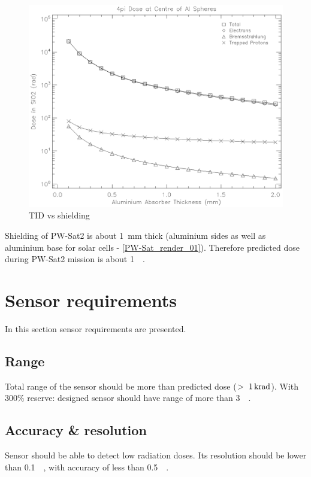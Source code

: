 	\begin{figure}[H]
		\centering
		\includegraphics[width=0.7\paperwidth]{img/dose.eps}
		\caption{TID vs shielding}
		\label{TIDvsSheilding}
	\end{figure}

	Shielding of PW-Sat2 is about \SI{1}{\milli\meter} thick (aluminium sides as well as aluminium base for solar cells - \ref{PW-Sat_render_01}). Therefore predicted dose during PW-Sat2 mission is about \SI{1}{\kilo\rad}.




\section{Sensor requirements}
	In this section sensor requirements are presented.

\subsection{Range}
	Total range of the sensor should be more than predicted dose ($>~\SI{1}{\kilo\radian}$). With $300\si{\percent}$ reserve: designed sensor should have range of more than \SI{3}{\kilo\rad}.
	
\subsection{Accuracy \& resolution}
	Sensor should be able to detect low radiation doses. Its resolution should be lower than \SI{0.1}{\kilo\rad}, with accuracy of less than \SI{0.5}{\kilo\rad}.




